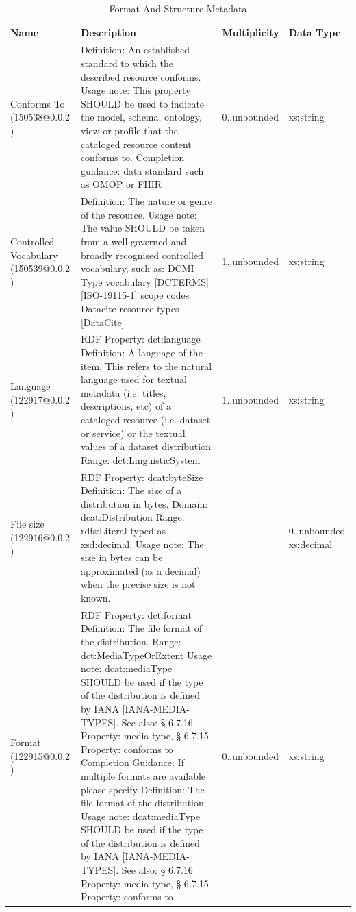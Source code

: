 \documentclass{article}
\begin{document}
\begin{table}[h]
	\begin{center}
		\caption{Format And Structure Metadata}
		\label{tab:format}
		\begin{tabular}{ p{3cm} | p{6cm} | p{2cm} | p{2cm}  } 
			\textbf{Name} &	\textbf{Description	}& \textbf{Multiplicity} &	\textbf{Data Type }\\
			\hline
			Conforms To (150538@0.0.2  ) &	Definition: An established standard to which the described resource conforms.
			Usage note: This property SHOULD be used to indicate the model, schema, ontology, view or profile that the cataloged resource content conforms to.
			Completion guidance: data standard such as OMOP or FHIR
& 0..unbounded	& xs:string\\
			\hline
			Controlled Vocabulary (150539@0.0.2  ) &	Definition: The nature or genre of the resource.
			Usage note: The value SHOULD be taken from a well governed and broadly recognised controlled vocabulary, such as:
			DCMI Type vocabulary [DCTERMS]
			[ISO-19115-1] scope codes
			Datacite resource types [DataCite]
 & 1..unbounded	& xs:string
			\\
			\hline
			Language (122917@0.0.2  ) &	RDF Property:	dct:language
			Definition:	A language of the item. This refers to the natural language used for textual metadata (i.e. titles, descriptions, etc) of a cataloged resource (i.e. dataset or service) or the textual values of a dataset distribution
			Range:	
			dct:LinguisticSystem
& 1..unbounded	& xs:string
			\\
			\hline
			File size (122916@0.0.2  ) &	RDF Property:	dcat:byteSize
			Definition:	The size of a distribution in bytes.
			Domain:	dcat:Distribution
			Range:	rdfs:Literal typed as xsd:decimal.
			Usage note:	The size in bytes can be approximated (as a decimal) when the precise size is not known.
&
			  & 0..unbounded	xs:decimal
			  \\
			  \hline
			 Format (122915@0.0.2  )&RDF Property:	dct:format
			 Definition:	The file format of the distribution.
			 Range:	dct:MediaTypeOrExtent
			 Usage note:	dcat:mediaType SHOULD be used if the type of the distribution is defined by IANA [IANA-MEDIA-TYPES].
			 See also:	§ 6.7.16 Property: media type, § 6.7.15 Property: conforms to
			  Completion Guidance: If multiple formats are available please specify
			  Definition: The file format of the distribution.
			  Usage note: dcat:mediaType SHOULD be used if the type of the distribution is defined by IANA [IANA-MEDIA-TYPES].
			  See also: § 6.7.16 Property: media type, § 6.7.15 Property: conforms to
			  & 0..unbounded &xs:string
\\
		\end{tabular}
	\end{center}
\end{table}
\end{document}
